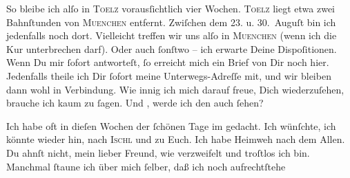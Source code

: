 \pstart
           So bleibe ich alſo in \textsc{Toelz} vorausſichtlich vier Wochen. \textsc{Toelz} liegt etwa zwei Bahnſtunden von \textsc{Muenchen} entfernt. Zwiſchen dem 23. u. 30. Auguſt bin ich jedenfalls noch dort. Vielleicht
               treffen wir uns alſo in \textsc{Muenchen} (wenn ich die Kur unterbrechen darf). Oder auch{ }ſonſtwo – ich erwarte Deine
               Dispoſitionen. Wenn Du mir{ }ſofort antworteſt,{ }ſo erreicht mich ein Brief von Dir noch
               hier. Jedenfalls theile ich Dir {\pb}ſofort meine  Unterwegs-Adreſſe mit, und wir bleiben dann wohl in Verbindung. Wie innig ich
               mich darauf freue, Dich wiederzuſehen, brauche ich kaum zu{ }ſagen. Und \label{K_L02741-2v}\label{K_L02741-2}, werde ich den auch{ }ſehen?\pend
           
\pstart
           Ich habe oft in dieſen Wochen der{ }ſchönen Tage im \label{K_L02741-3v}\label{K_L02741-3} gedacht. Ich wünſchte, ich könnte wieder hin, nach \textsc{Ischl}{ } und zu Euch. Ich habe Heimweh nach dem Allen. Du
               ahnſt nicht, mein lieber Freund, wie verzweifelt und troſtlos ich bin. Manchmal{ }ſtaune ich über mich{ }ſelber, daß ich {\pb}noch
                  aufrechtſtehe{\dotssix}\pend
           

